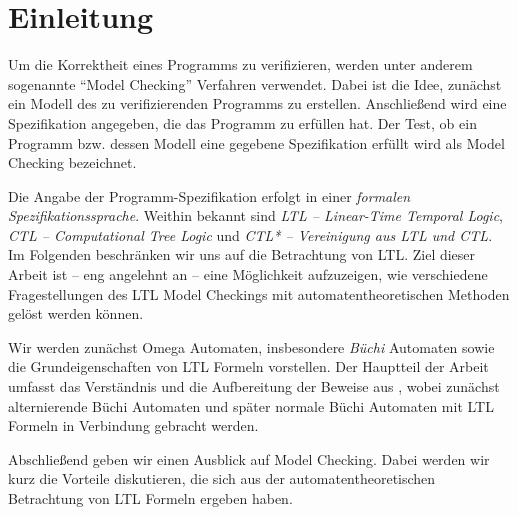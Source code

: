 \section{Einleitung}

Um die Korrektheit eines Programms zu verifizieren, werden unter anderem sogenannte "`Model Checking"' Verfahren verwendet. Dabei ist die Idee, zunächst ein Modell des zu verifizierenden Programms zu erstellen. Anschließend wird eine Spezifikation angegeben, die das Programm zu erfüllen hat. Der Test, ob ein Programm bzw. dessen Modell eine gegebene Spezifikation erfüllt wird als Model Checking bezeichnet.

Die Angabe der Programm-Spezifikation erfolgt in einer \textit{formalen Spezifikationssprache}. Weithin bekannt sind \textit{LTL -- Linear-Time Temporal Logic}, \textit{CTL -- Computational Tree Logic} und \textit{CTL* -- Vereinigung aus LTL und CTL}. Im Folgenden beschränken wir uns auf die Betrachtung von LTL. Ziel dieser Arbeit ist -- eng angelehnt an \cite{vardi+96} -- eine Möglichkeit aufzuzeigen, wie verschiedene Fragestellungen des LTL Model Checkings mit automatentheoretischen Methoden gelöst werden können. 

Wir werden zunächst Omega Automaten, insbesondere \textit{Büchi} Automaten sowie die Grundeigenschaften von LTL Formeln vorstellen. Der Hauptteil der Arbeit umfasst das Verständnis und die Aufbereitung der Beweise aus \cite{vardi+96}, wobei zunächst alternierende Büchi Automaten und später normale Büchi Automaten mit LTL Formeln in Verbindung gebracht werden.

Abschließend geben wir einen Ausblick auf Model Checking. Dabei werden wir kurz die Vorteile diskutieren, die sich aus der automatentheoretischen Betrachtung von LTL Formeln ergeben haben.